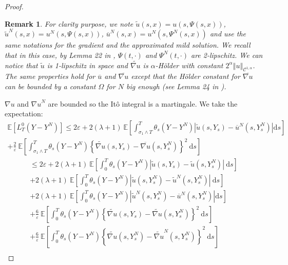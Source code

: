 \documentclass[11pt]{article}
\newtheorem{rem}{Remark}
\newcommand{\norme}[1]{\left\Vert #1\right\Vert}
\newcommand{\E}{\mathbb{E}}
\newcommand{\di}{\mathrm{d}}
\begin{document}
\begin{proof}
\begin{rem}  
    For clarity purpose, we note $\tilde{u}\left(s,x\right) = u\left(s,\Psi\left(s,x\right)\right)$, $\tilde{u}^N\left(s,x\right) = u^N\left(s,\Psi\left(s,x\right)\right)$, $\overline{u}^N\left(s,x\right) = u^N\left(s,\Psi^N\left(s,x\right)\right)$ and use the same notations for the gradient and the approximated mild solution. We recall that in this case, by Lemma 22 in \cite{Fla-Iss-Rus-2017}, $\Psi(t,\cdot)$ and $\Psi^N(t,\cdot)$ are 2-lipschitz. We can notice that $\tilde{u}$ is 1-lipschitz in space and $\widetilde{\nabla u}$ is $\alpha$-Hölder with constant $2^\alpha\norme{u}_{\mathcal{C}^{1,\alpha}}$. The same properties hold for $\overline{u}$ and $\overline{\nabla u}$ except that the Hölder constant for $\overline{\nabla u}$ can be bounded by a constant $\Omega$ for $N$ big enough (see Lemma 24 in \cite{Fla-Iss-Rus-2017}).
\end{rem}
${\nabla u}$ and ${\nabla u}^N$ are bounded so the Itô integral is a martingale. We take the expectation:
    \begin{multline*}
    \E\left[L^0_T(Y-Y^N)\right] \leq 2\varepsilon + 2(\lambda + 1)\ \E\left[\int_{\sigma_1\wedge T}^T\theta_s\left(Y-Y^N\right)\left|\widetilde{u}\left(s,Y_s\right)-\overline{u}^N\left(s,Y_s^N\right)\right| \di s \right]\\
    +\frac{2}{\varepsilon}\ \E\left[\int_{\sigma_1\wedge T}^T \theta_s\left(Y-Y^N\right)\left\{\widetilde{\nabla u}\left(s,Y_s\right)-{\overline{\nabla u}}\left(s,Y_s^N\right)\right\}^2\ \di s\right]
    \end{multline*}
    \begin{multline*}
    \leq 2\varepsilon + 2(\lambda + 1)\ \E\left[\int_0^T\theta_s\left(Y-Y^N\right)\left|\widetilde{u}\left(s,Y_s\right)-\widetilde{u}\left(s,Y_s^N\right)\right|\ \di s \right]\\+2(\lambda + 1)\ \E\left[\int_0^T\theta_s\left(Y-Y^N\right)\left|\widetilde{u}\left(s,Y_s^N\right)-\widetilde{u}^N\left(s,Y_s^N\right)\right|\ \di s \right]\\+ 2(\lambda + 1)\ \E\left[\int_{0}^T\theta_s\left(Y-Y^N\right)\left|\widetilde{u}^N\left(s,Y_s^N\right)-\overline{u}^N\left(s,Y_s^N\right)\right| \di s \right]\\
    +\frac{6}{\varepsilon}\ \E\left[\int_0^T \theta_s\left(Y-Y^N\right)\left\{\widetilde{\nabla u}\left(s,Y_s\right)-\widetilde{\nabla u}\left(s,Y_s^N\right)\right\}^2\ \di s\right]\\
    +\frac{6}{\varepsilon}\ \E\left[\int_0^T \theta_s\left(Y-Y^N\right)\left\{\widetilde{\nabla u}\left(s,Y_s^N\right)-\widetilde{\nabla u}^N\left(s,Y_s^N\right)\right\}^2\ \di s\right]\\

\end{multline*}
\end{proof}
\end{document}
